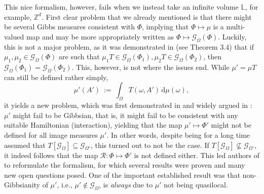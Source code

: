 \documentclass[12pt]{article}
\renewcommand{\d}{\mathrm{d}}
\newcommand{\G}{\mathcal{G}}
\renewcommand{\L}{\mathbb{L}}
\newcommand{\RR}{\mathcal{R}}
\newcommand{\Z}{\mathbb{Z}}
\newcommand{\1}{\mathbbm{1}}
\newcommand{\5}{\vspace{0.5cm}}
\theoremstyle{definition}
\begin{document}
This nice formalism, however, fails when we instead take an infinite volume $\L$, for example, $\Z^d$. First clear problem that we already mentioned is that there might be several Gibbs measures consistent with $\Phi$, implying that $\Phi\mapsto\mu$ is a multi-valued map and may be more appropriately written as $\Phi\mapsto\G_\Omega(\Phi)$. Luckily, this is not a major problem, as it was demonstrated in \cite{EFS} (see Theorem 3.4) that if $\mu_1,\mu_2\in\G_{\Omega}(\Phi)$ are such that $\mu_1 T\in\G_{\Omega}(\Phi_1),\mu_2 T\in\G_{\Omega}(\Phi_2)$, then $\G_{\Omega}(\Phi_1)=\G_{\Omega}(\Phi_2)$. This, however, is not where the issues end. While $\mu'=\mu T$ can still be defined rather simply,
$$\mu'(A') ~:=~ \int_\Omega T(\omega,A')\,\d\mu(\omega),$$
it yields a new problem, which was first demonstrated in \cite{Isr} and widely argued in \cite{EFS}: $\mu'$ might fail to be Gibbsian, that is, it might fail to be consistent with any suitable Hamiltonian (interaction), yielding that the map $\mu'\mapsto\Phi'$ might not be defined for all image measures $\mu'$. In other words, despite being for a long time assumed that $T[\G_\Omega]\subseteq\G_{\Omega'}$, this turned out to not be the case. If $T[\G_\Omega]\not\subseteq\G_{\Omega'}$, it indeed follows that the map $\RR:\Phi\mapsto\Phi'$ is not defined either. This led authors of \cite{EFS} to reformulate the formalism, for which several results were proven and many new open questions posed. One of the important established result was that non-Gibbsianity of $\mu'$, i.e., $\mu'\notin\G_\Omega$, is \textit{always} due to $\mu'$ not being quasilocal. \\
\end{document}
